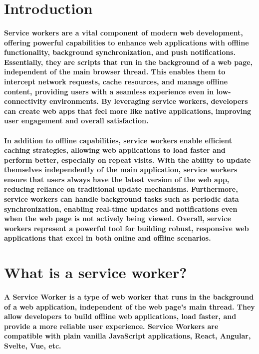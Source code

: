 \documentclass[12pt,a4paper]{article}
\begin{document}
	
	
	\section{Introduction}

    \paragraph{Service workers are a vital component of modern web development, offering
    powerful capabilities to enhance web applications with offline functionality, background
    synchronization, and push notifications. Essentially, they are scripts that run in the
    background of a web page, independent of the main browser thread. This enables
    them to intercept network requests, cache resources, and manage offline content,
    providing users with a seamless experience even in low-connectivity environments.
    By leveraging service workers, developers can create web apps that feel more like
    native applications, improving user engagement and overall satisfaction.}

    \paragraph{In addition to offline capabilities, service workers enable efficient caching
    strategies, allowing web applications to load faster and perform better, especially on
    repeat visits. With the ability to update themselves independently of the main
    application, service workers ensure that users always have the latest version of the
    web app, reducing reliance on traditional update mechanisms. Furthermore, service
    workers can handle background tasks such as periodic data synchronization, enabling
    real-time updates and notifications even when the web page is not actively being
    viewed. Overall, service workers represent a powerful tool for building robust,
    responsive web applications that excel in both online and offline scenarios.}

    \clearpage
    
    \section{What is a service worker?}

    \paragraph{A Service Worker is a type of web worker that runs in the background of a web
    application, independent of the web page’s main thread. They allow developers to
    build offline web applications, load faster, and provide a more reliable user experience.
    Service Workers are compatible with plain vanilla JavaScript applications, React,
    Angular, Svelte, Vue, etc.}
\end{document}
